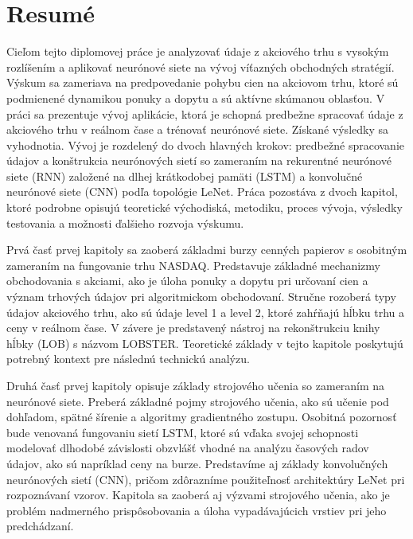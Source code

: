 \documentclass[a4paper,oneside,onecolumn,12pt]{book}
\begin{document}
\pagebreak
\section*{Resumé}
Cieľom tejto diplomovej práce je analyzovať údaje z akciového trhu s vysokým rozlíšením a aplikovať neurónové siete na vývoj víťazných obchodných stratégií. Výskum sa zameriava na predpovedanie pohybu cien na akciovom trhu, ktoré sú podmienené dynamikou ponuky a dopytu a sú aktívne skúmanou oblasťou. V práci sa prezentuje vývoj aplikácie, ktorá je schopná predbežne spracovať údaje z akciového trhu v reálnom čase a trénovať neurónové siete. Získané výsledky sa vyhodnotia. Vývoj je rozdelený do dvoch hlavných krokov: predbežné spracovanie údajov a konštrukcia neurónových sietí so zameraním na rekurentné neurónové siete (RNN) založené na dlhej krátkodobej pamäti (LSTM) a konvolučné neurónové siete (CNN) podľa topológie LeNet. Práca pozostáva z dvoch kapitol, ktoré podrobne opisujú teoretické východiská, metodiku, proces vývoja, výsledky testovania a možnosti ďalšieho rozvoja výskumu.

Prvá časť prvej kapitoly sa zaoberá základmi burzy cenných papierov s osobitným zameraním na fungovanie trhu NASDAQ. Predstavuje základné mechanizmy obchodovania s akciami, ako je úloha ponuky a dopytu pri určovaní cien a význam trhových údajov pri algoritmickom obchodovaní. Stručne rozoberá typy údajov akciového trhu, ako sú údaje level 1 a level 2, ktoré zahŕňajú hĺbku trhu a ceny v reálnom čase. V závere je predstavený nástroj na rekonštrukciu knihy hĺbky (LOB) s názvom LOBSTER. Teoretické základy v tejto kapitole poskytujú potrebný kontext pre následnú technickú analýzu.

Druhá časť prvej kapitoly opisuje základy strojového učenia so zameraním na neurónové siete. Preberá základné pojmy strojového učenia, ako sú učenie pod dohľadom, spätné šírenie a algoritmy gradientného zostupu. Osobitná pozornosť bude venovaná fungovaniu sietí LSTM, ktoré sú vďaka svojej schopnosti modelovať dlhodobé závislosti obzvlášť vhodné na analýzu časových radov údajov, ako sú napríklad ceny na burze. Predstavíme aj základy konvolučných neurónových sietí (CNN), pričom zdôrazníme použiteľnosť architektúry LeNet pri rozpoznávaní vzorov. Kapitola sa zaoberá aj výzvami strojového učenia, ako je problém nadmerného prispôsobovania a úloha vypadávajúcich vrstiev pri jeho predchádzaní.
\end{document}
